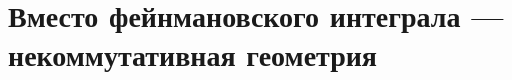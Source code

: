 \documentclass[11pt]{article}
\theoremstyle{remark}
\theoremstyle{definition}
\begin{document}

\section{Вместо фейнмановского интеграла --- некоммутативная геометрия}
\end{document}
